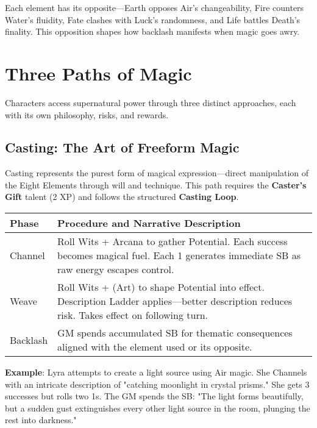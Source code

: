Each element has its opposite—Earth opposes Air's changeability, Fire counters Water's fluidity, Fate clashes with Luck's randomness, and Life battles Death's finality. This opposition shapes how backlash manifests when magic goes awry.

\section*{Three Paths of Magic}

Characters access supernatural power through three distinct approaches, each with its own philosophy, risks, and rewards.

\subsection*{Casting: The Art of Freeform Magic}

Casting represents the purest form of magical expression—direct manipulation of the Eight Elements through will and technique. This path requires the \textbf{Caster's Gift} talent (2 XP) and follows the structured \textbf{Casting Loop}.

\begin{fatebox}
\begin{tabularx}{\textwidth}{lp{}}
\toprule
\textbf{Phase} & \textbf{Procedure and Narrative Description} \\
\midrule
Channel & Roll Wits + Arcana to gather Potential. Each success becomes magical fuel. Each 1 generates immediate SB as raw energy escapes control. \\
Weave & Roll Wits + (Art) to shape Potential into effect. Description Ladder applies—better description reduces risk. Takes effect on following turn. \\
Backlash & GM spends accumulated SB for thematic consequences aligned with the element used or its opposite. \\
\bottomrule
\end{tabularx}
\end{fatebox}

\textbf{Example}: Lyra attempts to create a light source using Air magic. She Channels with an intricate description of "catching moonlight in crystal prisms." She gets 3 successes but rolls two 1s. The GM spends the SB: "The light forms beautifully, but a sudden gust extinguishes every other light source in the room, plunging the rest into darkness."

